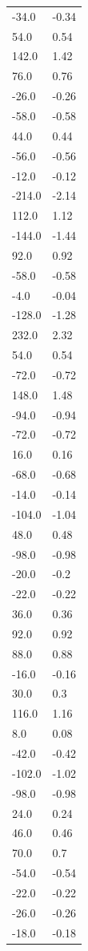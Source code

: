 \begin{longtable}{ll}
-34.0 & -0.34 \\
54.0 & 0.54 \\
142.0 & 1.42 \\
76.0 & 0.76 \\
-26.0 & -0.26 \\
-58.0 & -0.58 \\
44.0 & 0.44 \\
-56.0 & -0.56 \\
-12.0 & -0.12 \\
-214.0 & -2.14 \\
112.0 & 1.12 \\
-144.0 & -1.44 \\
92.0 & 0.92 \\
-58.0 & -0.58 \\
-4.0 & -0.04 \\
-128.0 & -1.28 \\
232.0 & 2.32 \\
54.0 & 0.54 \\
-72.0 & -0.72 \\
148.0 & 1.48 \\
-94.0 & -0.94 \\
-72.0 & -0.72 \\
16.0 & 0.16 \\
-68.0 & -0.68 \\
-14.0 & -0.14 \\
-104.0 & -1.04 \\
48.0 & 0.48 \\
-98.0 & -0.98 \\
-20.0 & -0.2 \\
-22.0 & -0.22 \\
36.0 & 0.36 \\
92.0 & 0.92 \\
88.0 & 0.88 \\
-16.0 & -0.16 \\
30.0 & 0.3 \\
116.0 & 1.16 \\
8.0 & 0.08 \\
-42.0 & -0.42 \\
-102.0 & -1.02 \\
-98.0 & -0.98 \\
24.0 & 0.24 \\
46.0 & 0.46 \\
70.0 & 0.7 \\
-54.0 & -0.54 \\
-22.0 & -0.22 \\
-26.0 & -0.26 \\
-18.0 & -0.18 \\

\end{longtable}
